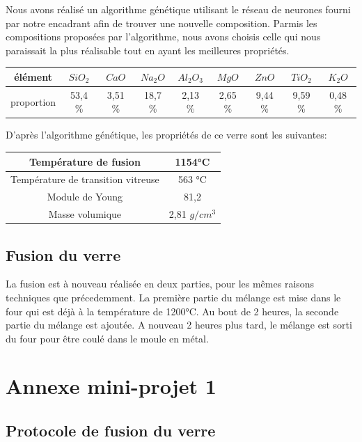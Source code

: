 \documentclass{article}
\begin{document}
Nous avons réalisé un algorithme génétique utilisant le réseau de neurones fourni par notre encadrant afin de trouver une nouvelle composition. 
Parmis les compositions proposées par l'algorithme, nous avons choisis celle qui nous paraissait la plus réalisable tout en ayant les meilleures propriétés.

\begin{table}[h!]
    \centering
    \begin{tabular}{|c|c|c|c|c|c|c|c|c|}
        \hline
        élément &  $SiO_2$ & $CaO$ & $Na_2O$ & $Al_2O_3$ & $MgO$ & $ZnO$ & $TiO_2$ & $K_2O$ \\
        \hline
        proportion & 53,4 \% & 3,51 \% & 18,7 \% & 2,13 \% & 2,65 \% & 9,44 \% & 9,59 \% & 0,48 \%\\
        \hline
        \end{tabular} 
    \end{table}
D'après l'algorithme génétique, les propriétés de ce verre sont les suivantes:

\begin{table}[h!]
    \centering
\begin{tabular}{|c|c|}
    \hline
    Température de fusion & 1154°C \\
    \hline
    Température de transition vitreuse & 563 °C \\
    \hline
    Module de Young & 81,2 \\
    \hline
    Masse volumique & 2,81 $g/cm^{3}$ \\
    \hline
    \end{tabular} 
\end{table}

\subsection{Fusion du verre}

La fusion est à nouveau réalisée en deux parties, pour les mêmes raisons techniques que précedemment.
La première partie du mélange est mise dans le four qui est déjà à la température de 1200°C. Au bout de 2 heures, la seconde partie du mélange est ajoutée. A nouveau 2 heures plus tard, le mélange est sorti du four pour être coulé dans le moule en métal.

\section{Annexe mini-projet 1}
\subsection{Protocole de fusion du verre}
\end{document}
